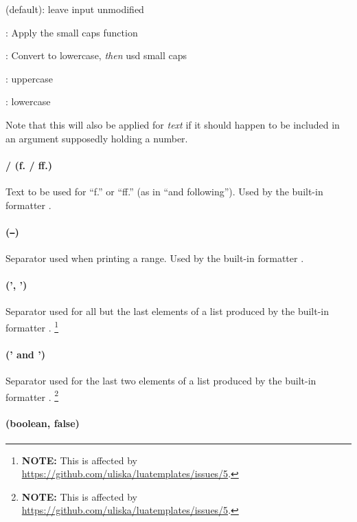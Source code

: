 \documentclass[12pt]{scrartcl}
\begin{document}
\begin{itemize*}
\item {} (default): leave input unmodified
\item {}: Apply the small caps function
\item {}: Convert to lowercase, \emph{then} usd small caps
\item {}: uppercase
\item {}: lowercase
\end{itemize*}

\noindent Note that this will also be applied for \emph{text} if it should
happen to be included in an argument supposedly holding a number.

\paragraph{ /  (f. / ff.)}

Text to be used for “f.” or “ff.” (as in “and following”).  Used by the built-in formatter .


\paragraph{ (\texttt{--})}

Separator used when printing a range.  Used by the built-in formatter .


\paragraph{ (', ')}

Separator used for all but the last elements of a list produced by the built-in formatter
.%
\footnote{\textbf{NOTE:} This is affected by
\url{https://github.com/uliska/luatemplates/issues/5}.}


\paragraph{ (' and ')}

Separator used for the last two elements of a list produced by the built-in formatter
.%
\footnote{\textbf{NOTE:} This is affected by
\url{https://github.com/uliska/luatemplates/issues/5}.}


\paragraph{ (boolean, false)}
\end{document}
